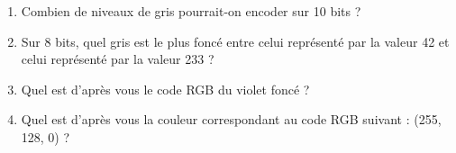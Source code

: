 \documentclass[11pt, a4paper]{book}
\begin{document}
\begin{exercice}
\begin{enumerate}
    \item Combien de niveaux de gris pourrait-on encoder sur 10 bits ?
    
    \item Sur 8 bits, quel gris est le plus foncé entre celui représenté par la valeur 42 et celui représenté par la valeur 233 ? 

    \item Quel est d'après vous le code RGB du violet foncé ? %

    \item Quel est d'après vous la couleur correspondant au code RGB suivant : (255, 128, 0) ? %
\end{enumerate}
\end{exercice}
\end{document}
